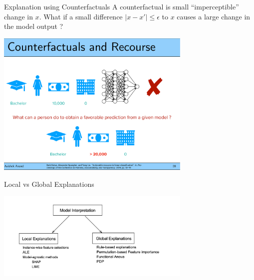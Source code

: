 \documentclass[aspectratio=169]{../latex_main/tntbeamer}  %
\begin{document}
\begin{frame}[c]{Explanation using Counterfactuals}
	\vspace{-1em}
    A counterfactual is small ``imperceptible'' change in $x$. What if a small difference $ |x - x'| \leq \epsilon$ to $x$ causes a large change in the model output ?
	\begin{center}
		\includegraphics[page=1, width=0.7\textwidth]{./figure/counterfactual.pdf}
	\end{center}
	
\end{frame}

\begin{frame}[c]{Local vs Global Explanations}
	\begin{center}
		\includegraphics[width=0.7\textwidth]{./figure/1-local-global.png}
	\end{center}
\end{frame}
\end{document}
